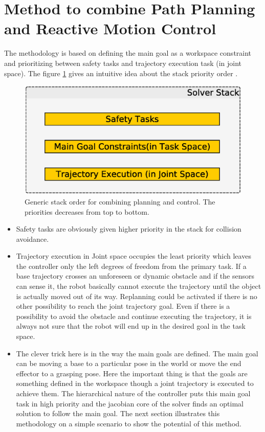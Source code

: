 \section{Method to combine Path Planning and Reactive Motion Control}
The methodology is based on defining the main goal as a workspace constraint and prioritizing between safety tasks and trajectory execution task (in joint space). The figure \ref{gso} gives an intuitive idea about the stack priority order .
   \begin{figure}[thpb]
      \centering
      \includegraphics[scale=0.5]{chapters/doa/images/ProposedMethodology.eps}
      \caption{Generic stack order for combining planning and control. The priorities decreases from top to bottom. }
      \label{gso}
   \end{figure}

\begin{itemize}
 \item Safety tasks are obviously given higher priority in the stack for collision avoidance.
 \item Trajectory execution in Joint space occupies the least priority which leaves the controller only the left degrees of freedom from the primary task. If a base trajectory crosses an unforeseen or dynamic obstacle and if the sensors can sense it, the robot basically cannot execute the trajectory until the object is actually moved out of its way. Replanning could be activated if there is no other possibility to reach the joint trajectory goal. Even if there is a possibility to avoid the obstacle and continue executing the  trajectory, it is always not sure that the robot will end up in the desired goal in the task space. 
 
 \item The clever trick here is in the way the main goals are defined. The main goal can be moving a base to a particular pose in the world or move the end effector to a grasping pose. Here the important thing is that the goals are something defined in the workspace though a joint trajectory is executed to achieve them. The hierarchical nature of the controller puts this main goal task in high priority and the jacobian core of the solver finds an optimal solution to follow the main goal. The next section illustrates this methodology on a simple scenario to show the potential of this method.
\end{itemize}
